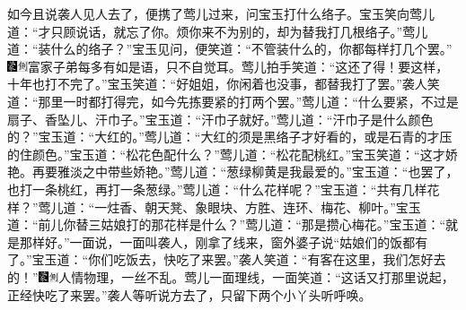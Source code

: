 如今且说袭人见人去了，便携了莺儿过来，问宝玉打什么络子。宝玉笑向莺儿道：``才只顾说话，就忘了你。烦你来不为别的，却为替我打几根络子。''莺儿道：``装什么的络子？''宝玉见问，便笑道：``不管装什么的，你都每样打几个罢。''{\includegraphics[width=3mm]{../Images/00006}\includegraphics[width=3mm]{../Images/00011}\footnotesize \kaishu 富家子弟每多有如是语，只不自觉耳。}莺儿拍手笑道：``这还了得！要这样，十年也打不完了。''宝玉笑道：``好姐姐，你闲着也没事，都替我打了罢。''袭人笑道：``那里一时都打得完，如今先拣要紧的打两个罢。''莺儿道：``什么要紧，不过是扇子、香坠儿、汗巾子。''宝玉道：``汗巾子就好。''莺儿道：``汗巾子是什么颜色的？''宝玉道：``大红的。''莺儿道：``大红的须是黑络子才好看的，或是石青的才压的住颜色。''宝玉道：``松花色配什么？''莺儿道：``松花配桃红。''宝玉笑道：``这才娇艳。再要雅淡之中带些娇艳。''莺儿道：``葱绿柳黄是我最爱的。''宝玉道：``也罢了，也打一条桃红，再打一条葱绿。''莺儿道：``什么花样呢？''宝玉道：``共有几样花样？''莺儿道：``一炷香、朝天凳、象眼块、方胜、连环、梅花、柳叶。''宝玉道：``前儿你替三姑娘打的那花样是什么？''莺儿道：``那是攒心梅花。''宝玉道：``就是那样好。''一面说，一面叫袭人，刚拿了线来，窗外婆子说``姑娘们的饭都有了。''宝玉道：``你们吃饭去，快吃了来罢。''袭人笑道：``有客在这里，我们怎好去的！''{\includegraphics[width=3mm]{../Images/00006}\includegraphics[width=3mm]{../Images/00011}\footnotesize \kaishu 人情物理，一丝不乱。}莺儿一面理线，一面笑道：``这话又打那里说起，正经快吃了来罢。''袭人等听说方去了，只留下两个小丫头听呼唤。

